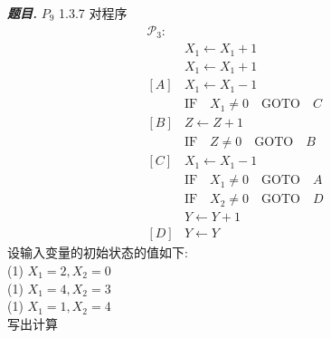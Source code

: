 \documentclass[10pt, a4paper, oneside]{ctexart}
\newenvironment{problem}{\begin{framed}\par\noindent\textbf{\textit{题目. }}}{\end{framed}\par}
\begin{document}
\begin{problem}
$P_9$ 1.3.7 对程序
\begin{align*}
    \mathscr{P}_3:& \\
    &X_1\leftarrow X_1+1\\
    &X_1\leftarrow X_1+1\\
    [A]&X_1 \leftarrow X_1-1\\
    &\text{IF}\quad X_1\neq 0 \quad\text{GOTO}\quad C\\
    [B]& Z\leftarrow Z+1\\
    &\text{IF}\quad Z\neq 0\quad \text{GOTO}\quad B\\
    [C]& X_1\leftarrow X_1-1\\
    &\text{IF}\quad X_1\neq 0\quad \text{GOTO}\quad A\\
    &\text{IF}\quad X_2\neq 0\quad \text{GOTO}\quad D\\
    &Y\leftarrow Y+1\\
    [D]& Y\leftarrow Y
\end{align*}
设输入变量的初始状态的值如下: \\
(1) $X_1=2, X_2=0$\\
(1) $X_1=4, X_2=3$\\
(1) $X_1=1, X_2=4$\\
写出计算
\end{problem}
\end{document}
